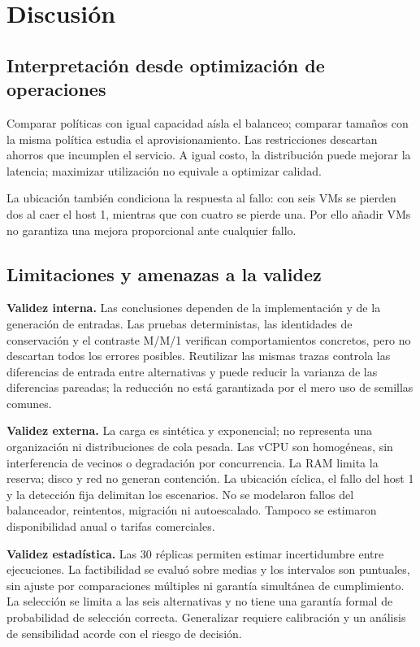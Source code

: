 \section{Discusión}
\subsection{Interpretación desde optimización de operaciones}
Comparar políticas con igual capacidad aísla el balanceo; comparar tamaños con la misma política estudia el aprovisionamiento. Las restricciones descartan ahorros que incumplen el servicio. A igual costo, la distribución puede mejorar la latencia; maximizar utilización no equivale a optimizar calidad.

La ubicación también condiciona la respuesta al fallo: con seis VMs se pierden dos al caer el host 1, mientras que con cuatro se pierde una. Por ello añadir VMs no garantiza una mejora proporcional ante cualquier fallo.

\subsection{Limitaciones y amenazas a la validez}
\textbf{Validez interna.} Las conclusiones dependen de la implementación y de la generación de entradas. Las pruebas deterministas, las identidades de conservación y el contraste M/M/1 verifican comportamientos concretos, pero no descartan todos los errores posibles. Reutilizar las mismas trazas controla las diferencias de entrada entre alternativas y puede reducir la varianza de las diferencias pareadas; la reducción no está garantizada por el mero uso de semillas comunes.

\textbf{Validez externa.} La carga es sintética y exponencial; no representa una organización ni distribuciones de cola pesada. Las vCPU son homogéneas, sin interferencia de vecinos o degradación por concurrencia. La RAM limita la reserva; disco y red no generan contención. La ubicación cíclica, el fallo del host 1 y la detección fija delimitan los escenarios. No se modelaron fallos del balanceador, reintentos, migración ni autoescalado. Tampoco se estimaron disponibilidad anual o tarifas comerciales.

\textbf{Validez estadística.} Las 30 réplicas permiten estimar incertidumbre entre ejecuciones. La factibilidad se evaluó sobre medias y los intervalos son puntuales, sin ajuste por comparaciones múltiples ni garantía simultánea de cumplimiento. La selección se limita a las seis alternativas y no tiene una garantía formal de probabilidad de selección correcta. Generalizar requiere calibración y un análisis de sensibilidad acorde con el riesgo de decisión.

